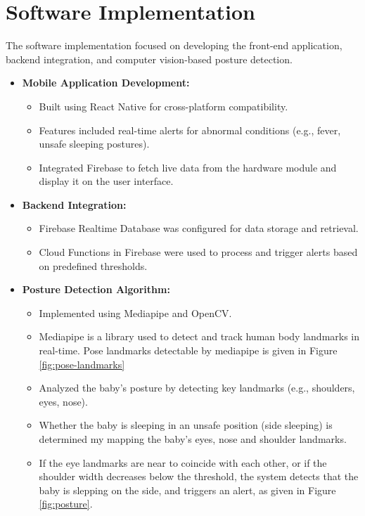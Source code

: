 \documentclass[12pt,a4paper]{report}
\begin{document}
\section{Software Implementation}
The software implementation focused on developing the front-end application, backend integration, and computer vision-based posture detection.
\begin{itemize}
  \item \textbf{Mobile Application Development:}
   \begin{itemize}
    \item Built using React Native for cross-platform compatibility.
    \item Features included real-time alerts for abnormal conditions (e.g., fever, unsafe sleeping postures).
    \item Integrated Firebase to fetch live data from the hardware module and display it on the user interface.
  \end{itemize}
  \item \textbf{Backend Integration:}
  \begin{itemize}
    \item Firebase Realtime Database was configured for data storage and retrieval.
    \item Cloud Functions in Firebase were used to process and trigger alerts based on predefined thresholds.
  \end{itemize}
  \item \textbf{Posture Detection Algorithm:}
  \begin{itemize}
    \item Implemented using Mediapipe and OpenCV.
    \item Mediapipe is a library used to detect and track human body landmarks in real-time. Pose landmarks detectable by mediapipe is given in Figure \ref{fig:pose-landmarks}
    \item Analyzed the baby's posture by detecting key landmarks (e.g., shoulders, eyes, nose).
    \item Whether the baby is sleeping in an unsafe position (side sleeping) is determined my mapping the baby's eyes, nose and shoulder landmarks.
    \item If the eye landmarks are near to coincide with each other, or if the shoulder width decreases below the threshold, the system detects that the baby is slepping on the side, and triggers an alert, as given in Figure \ref{fig:posture}.
  \end{itemize}
  \begin{figure}[htbp]

\end{figure}
\end{itemize}
\end{document}

